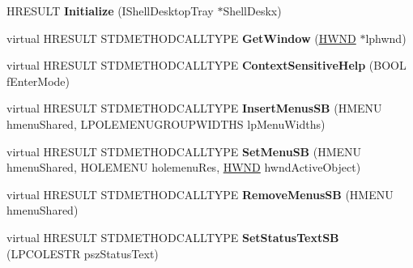 \begin{DoxyCompactItemize}
\item 
\mbox{\label{class_c_desktop_browser_a556ee4380eb31b9f46bd03ae0b728b8f}} 
H\+R\+E\+S\+U\+LT {\bfseries Initialize} (I\+Shell\+Desktop\+Tray $\ast$Shell\+Deskx)
\item 
\mbox{\label{class_c_desktop_browser_aa07fc415e6a57068162f397343876928}} 
virtual H\+R\+E\+S\+U\+LT S\+T\+D\+M\+E\+T\+H\+O\+D\+C\+A\+L\+L\+T\+Y\+PE {\bfseries Get\+Window} (\hyperlink{interfacevoid}{H\+W\+ND} $\ast$lphwnd)
\item 
\mbox{\label{class_c_desktop_browser_a68ac62545ff3429bae9cb7f22902e1df}} 
virtual H\+R\+E\+S\+U\+LT S\+T\+D\+M\+E\+T\+H\+O\+D\+C\+A\+L\+L\+T\+Y\+PE {\bfseries Context\+Sensitive\+Help} (B\+O\+OL f\+Enter\+Mode)
\item 
\mbox{\label{class_c_desktop_browser_a8c91db31463bae87d2623f6d9c0188cb}} 
virtual H\+R\+E\+S\+U\+LT S\+T\+D\+M\+E\+T\+H\+O\+D\+C\+A\+L\+L\+T\+Y\+PE {\bfseries Insert\+Menus\+SB} (H\+M\+E\+NU hmenu\+Shared, L\+P\+O\+L\+E\+M\+E\+N\+U\+G\+R\+O\+U\+P\+W\+I\+D\+T\+HS lp\+Menu\+Widths)
\item 
\mbox{\label{class_c_desktop_browser_a80e132802f9740abc31c4f6f938d5ba1}} 
virtual H\+R\+E\+S\+U\+LT S\+T\+D\+M\+E\+T\+H\+O\+D\+C\+A\+L\+L\+T\+Y\+PE {\bfseries Set\+Menu\+SB} (H\+M\+E\+NU hmenu\+Shared, H\+O\+L\+E\+M\+E\+NU holemenu\+Res, \hyperlink{interfacevoid}{H\+W\+ND} hwnd\+Active\+Object)
\item 
\mbox{\label{class_c_desktop_browser_a24419bbef8d09de8fff4266b63d31205}} 
virtual H\+R\+E\+S\+U\+LT S\+T\+D\+M\+E\+T\+H\+O\+D\+C\+A\+L\+L\+T\+Y\+PE {\bfseries Remove\+Menus\+SB} (H\+M\+E\+NU hmenu\+Shared)
\item 
\mbox{\label{class_c_desktop_browser_a48c3cdda00a263ce22a3637946cc158e}} 
virtual H\+R\+E\+S\+U\+LT S\+T\+D\+M\+E\+T\+H\+O\+D\+C\+A\+L\+L\+T\+Y\+PE {\bfseries Set\+Status\+Text\+SB} (L\+P\+C\+O\+L\+E\+S\+TR psz\+Status\+Text)
\item 
\mbox{\label{class_c_desktop_browser_ade34ed8c9ef275dbd3471b5e683e105d}} 

\end{DoxyCompactItemize}
